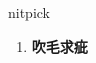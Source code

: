 
\begin{frame}
{\huge nitpick}
\begin{center}
\begin{enumerate}\Large
  \item \textbf{吹毛求疵}
\end{enumerate}
\end{center}
\end{frame}
